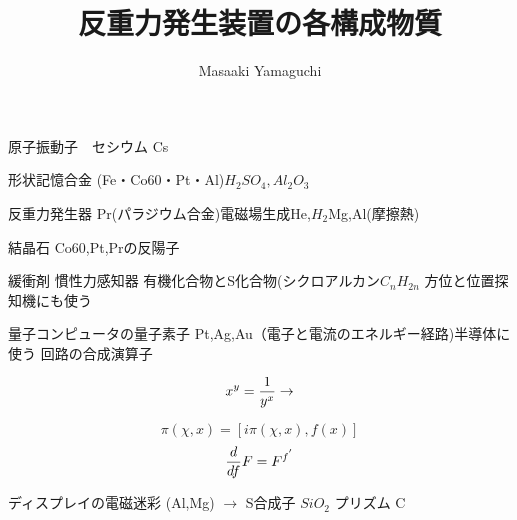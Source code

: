 \documentclass{jsarticle}
\begin{document}
\title{反重力発生装置の各構成物質}
\author{Masaaki Yamaguchi}
\date{}
\maketitle



  原子振動子　セシウム Cs


  形状記憶合金 (Fe・Co60・Pt・Al)$H_2 SO_4, Al_2 O_3$


  反重力発生器 Pr(パラジウム合金)電磁場生成He,$H_2$Mg,Al(摩擦熱)


  結晶石 Co60,Pt,Prの反陽子


  緩衝剤 慣性力感知器 有機化合物とS化合物(シクロアルカン$C_n H_{2n}$
  方位と位置探知機にも使う


  量子コンピュータの量子素子 Pt,Ag,Au（電子と電流のエネルギー経路)半導体に
  使う
  回路の合成演算子 


  $$ x^y = {1 \over {y^x}} \to $$

  $$ \pi(\chi,x) = [i\pi(\chi,x),f(x)] $$
  $$ {d \over df}F = F^{{f}^{'}} $$


  ディスプレイの電磁迷彩 (Al,Mg) $\to$ S合成子 $Si O_2 $
  プリズム C
\end{document}
